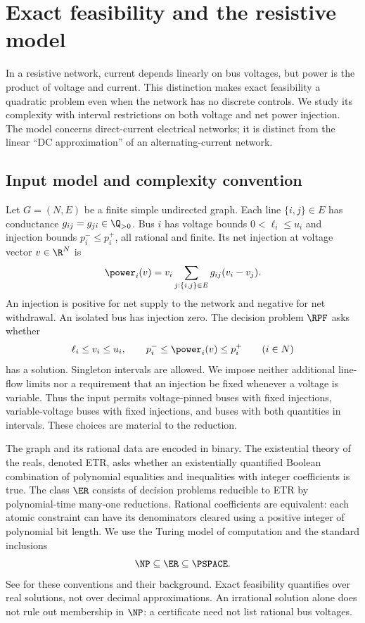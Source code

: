 \section{Exact feasibility and the resistive model}
\label{sec:foundations}

In a resistive network, current depends linearly on bus voltages, but power is
the product of voltage and current. This distinction makes exact feasibility a
quadratic problem even when the network has no discrete controls. We study its
complexity with interval restrictions on both voltage and net power injection.
The model concerns direct-current electrical networks; it is distinct from
the linear ``DC approximation'' of an alternating-current network.

\subsection{Input model and complexity convention}

Let $G=(N,E)$ be a finite simple undirected graph. Each line $\{i,j\}\in E$
has conductance $g_{ij}=g_{ji}\in\Q_{>0}$. Bus $i$ has voltage bounds
$0<\ell_i\le u_i$ and injection bounds $p_i^-\le p_i^+$, all rational and
finite. Its net injection at voltage vector $v\in\R^N$ is
\begin{equation}
 \power_i(v)=v_i\sum_{j:\{i,j\}\in E}g_{ij}(v_i-v_j).
 \label{eq:rpf}
\end{equation}
An injection is positive for net supply to the network and negative for net
withdrawal. An isolated bus has injection zero. The decision problem $\RPF$
asks whether
\begin{equation}
 \ell_i\le v_i\le u_i,\qquad
 p_i^-\le\power_i(v)\le p_i^+\qquad(i\in N)
 \label{eq:rpf-bounds}
\end{equation}
has a solution. Singleton intervals are allowed. We impose neither additional
line-flow limits nor a requirement that an injection be fixed whenever a
voltage is variable. Thus the input permits voltage-pinned buses with fixed
injections, variable-voltage buses with fixed injections, and buses with both
quantities in intervals. These choices are material to the reduction.

The graph and its rational data are encoded in binary. The existential
theory of the reals, denoted ETR, asks whether an existentially quantified
Boolean combination of polynomial equalities and inequalities with integer
coefficients is true. The class $\ER$ consists of decision problems reducible
to ETR by polynomial-time many-one reductions. Rational coefficients are
equivalent: each atomic constraint can have its denominators cleared using
a positive integer of polynomial bit length. We use the Turing model of
computation and the standard inclusions
\begin{equation}
 \NP\subseteq\ER\subseteq\PSPACE.
 \label{eq:complexity-inclusions}
\end{equation}
See \citet[Section 1.1]{AbrahamsenMiltzow2019} for these conventions and their
background. Exact feasibility quantifies over real solutions, not over decimal
approximations. An irrational solution alone does not rule out membership in
$\NP$: a certificate need not list rational bus voltages.

